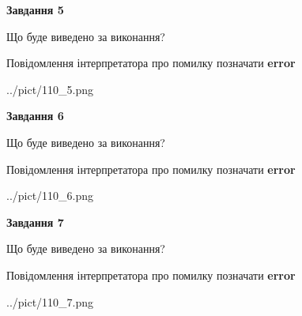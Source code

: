 \documentclass[10pt, ukrainian]{article}
\begin{document}
{\begin {large}
{\begin {center}\textbf{Завдання 5}\end {center}}\par
Що буде виведено за виконання? \par
Повідомлення інтерпретатора про помилку позначати \textbf{error}

\begin{center}
	{../pict/110_5.png}
\end{center}
\newpage

{\begin {center}\textbf{Завдання 6}\end {center}}\par
Що буде виведено за виконання? \par
Повідомлення інтерпретатора про помилку позначати \textbf{error}

\begin{center}
	{../pict/110_6.png}
\end{center}
\newpage

{\begin {center}\textbf{Завдання 7}\end {center}}\par
Що буде виведено за виконання? \par
Повідомлення інтерпретатора про помилку позначати \textbf{error}

\begin{center}
	{../pict/110_7.png}
\end{center}
\newpage

\end {large}}
\end{document}
